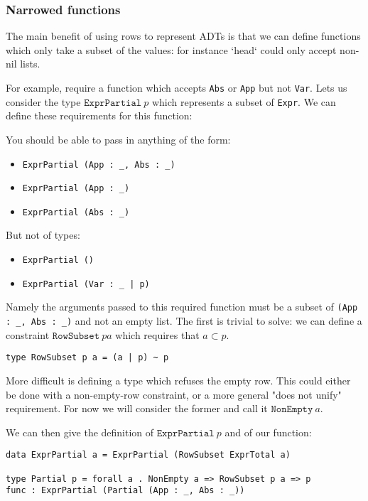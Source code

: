 \subsubsection{Narrowed functions}
The main benefit of using rows to represent ADTs is that we can define functions which only take a subset of the values: for instance `head` could only accept non-nil lists.

For example, require a function which accepts \texttt{Abs} or \texttt{App} but not \texttt{Var}. Lets us consider the type $\mathtt{ExprPartial}\ p$ which represents a subset of \texttt{Expr}. We can define these requirements for this function:

You should be able to pass in anything of the form:
\begin{itemize}
\item \texttt{ExprPartial (App : _, Abs : _)}
\item \texttt{ExprPartial (App : _)}
\item \texttt{ExprPartial (Abs : _)}
\end{itemize}

But not of types:

\begin{itemize}
\item \texttt{ExprPartial ()}
\item \texttt{ExprPartial (Var : _ | p)}
\end{itemize}
 
Namely the arguments passed to this required function must be a subset of \texttt{(App : _, Abs : _)} and not an empty list. The first is trivial to solve: we can define a constraint $\mathtt{RowSubset}\ p a$ which requires that $a \subset p$.

\begin{verbatim}
type RowSubset p a = (a | p) ~ p
\end{verbatim}

More difficult is defining a type which refuses the empty row. This could either be done with a non-empty-row constraint, or a more general "does not unify" requirement. For now we will consider the former and call it $\mathtt{NonEmpty}\ a$.

We can then give the definition of $\mathtt{ExprPartial}\ p$ and of our function:

\begin{verbatim}
data ExprPartial a = ExprPartial (RowSubset ExprTotal a)

type Partial p = forall a . NonEmpty a => RowSubset p a => p
func : ExprPartial (Partial (App : _, Abs : _))
\end{verbatim}

